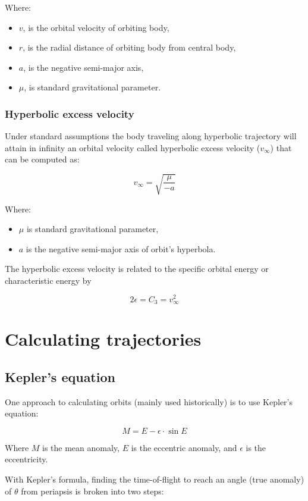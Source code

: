 \documentclass[12pt]{article}
\begin{document}
Where:

\begin{itemize}
  \item \(v\), is the orbital velocity of orbiting body,
  \item \(r\), is the radial distance of orbiting body from central body,
  \item \(a\), is the negative semi-major axis,
  \item \(\mu\), is standard gravitational parameter.
\end{itemize}

\subsubsection{Hyperbolic excess velocity}

Under standard assumptions the body traveling along hyperbolic trajectory will attain in infinity an orbital velocity called hyperbolic excess velocity (\(v_\infty\)) that can be computed as:

\[v_\infty=\sqrt{\frac{\mu}{-a}}\]

Where:

\begin{itemize}
  \item \(\mu\) is standard gravitational parameter,
  \item \(a\) is the negative semi-major axis of orbit's hyperbola.
\end{itemize}

The hyperbolic excess velocity is related to the specific orbital energy or characteristic energy by

\[2\epsilon=C_3=v_{\infty}^2\]

\section{Calculating trajectories}

\subsection{Kepler's equation}

One approach to calculating orbits (mainly used historically) is to use Kepler's equation:

\[M=E-\epsilon\cdot\sin E\]

Where \(M\) is the mean anomaly, \(E\) is the eccentric anomaly, and \(\epsilon\) is the eccentricity.

With Kepler's formula, finding the time-of-flight to reach an angle (true anomaly) of \(\theta\) from periapsis is broken into two steps:
\end{document}
